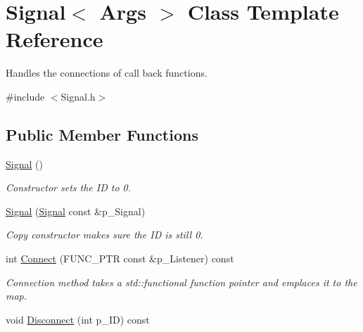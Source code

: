 \hypertarget{class_signal}{}\section{Signal$<$ Args $>$ Class Template Reference}
\label{class_signal}


Handles the connections of call back functions.  




{\ttfamily \#include $<$Signal.\+h$>$}

\subsection*{Public Member Functions}
\begin{DoxyCompactItemize}
\item 
\mbox{\label{class_signal_a3437b8fd65f60a38d45d4d92349dd544}} 
\hyperlink{class_signal_a3437b8fd65f60a38d45d4d92349dd544}{Signal} ()
\begin{DoxyCompactList}\small\item\em Constructor sets the ID to 0. \end{DoxyCompactList}\item 
\mbox{\label{class_signal_a249b93a84b73e8bda0373f6595e6724f}} 
\hyperlink{class_signal_a249b93a84b73e8bda0373f6595e6724f}{Signal} (\hyperlink{class_signal}{Signal} const \&p\+\_\+\+Signal)
\begin{DoxyCompactList}\small\item\em Copy constructor makes sure the ID is still 0. \end{DoxyCompactList}\item 
\mbox{\label{class_signal_a3ddf10ab607a60af919faa9494836e9e}} 
int \hyperlink{class_signal_a3ddf10ab607a60af919faa9494836e9e}{Connect} (F\+U\+N\+C\+\_\+\+P\+TR const \&p\+\_\+\+Listener) const
\begin{DoxyCompactList}\small\item\em Connection method takes a std\+::functional function pointer and emplaces it to the map. \end{DoxyCompactList}\item 
\mbox{\label{class_signal_a7fe765fc1c513307fd7ae28f0f907f0d}} 
void \hyperlink{class_signal_a7fe765fc1c513307fd7ae28f0f907f0d}{Disconnect} (int p\+\_\+\+ID) const

\end{DoxyCompactItemize}
